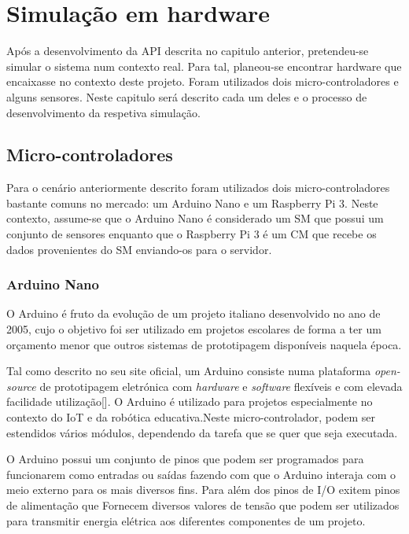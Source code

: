 
\chapter{Simulação em hardware}

Após a desenvolvimento da API descrita no capitulo anterior, pretendeu-se simular o sistema num contexto real. Para tal, planeou-se encontrar hardware que encaixasse no contexto deste projeto. Foram utilizados dois micro-controladores e alguns sensores. Neste capitulo será descrito cada um deles e o processo de desenvolvimento da respetiva simulação.  




\section{Micro-controladores}


Para o cenário anteriormente descrito foram utilizados dois micro-controladores bastante comuns no mercado: um Arduino Nano e um Raspberry Pi 3. Neste contexto, assume-se que o Arduino Nano é considerado um \ac{SM} que possui um conjunto de sensores enquanto que o Raspberry Pi 3 é um \ac{CM} que recebe os dados provenientes do \ac{SM} enviando-os para o servidor. 


\subsection{Arduino Nano}


O Arduino é fruto da evolução de um projeto italiano desenvolvido no ano de 2005, cujo o objetivo foi ser utilizado em projetos escolares de forma a ter um orçamento menor que outros sistemas de prototipagem disponíveis naquela época.

Tal como descrito no seu site oficial, um Arduino consiste numa plataforma \textit{open-source} de prototipagem eletrónica com \textit{hardware} e \textit{software} flexíveis e com elevada facilidade utilização[]. O Arduino é utilizado para projetos especialmente no contexto do \ac{IoT} e da robótica educativa.Neste micro-controlador, podem ser estendidos vários módulos, dependendo da tarefa que se quer que seja executada. 



O Arduino possui um conjunto de pinos que podem ser programados para funcionarem como entradas ou saídas fazendo com que o Arduino interaja com o meio externo para os mais diversos fins. Para além dos pinos de I/O exitem pinos de alimentação que Fornecem diversos valores de tensão que podem ser utilizados para transmitir energia elétrica aos diferentes componentes de um projeto. 

